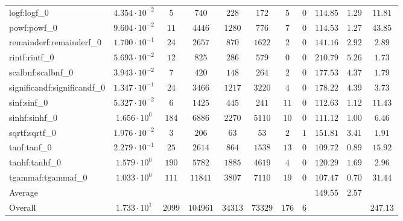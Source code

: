 \begin{tabular}{|l|c|c|c|c|c|c|c|c|c|c|}
logf:logf\_0                 & $ 4.354 \cdot 10^{-2} $ & $ 5      $ & $ 740    $ & $ 228   $ & $ 172   $ & $ 5   $ & $ 0 $ & $ 114.85      $ & $ 1.29    $ & $ 11.81   $ \\
powf:powf\_0                 & $ 9.604 \cdot 10^{-2} $ & $ 11     $ & $ 4446   $ & $ 1280  $ & $ 776   $ & $ 7   $ & $ 0 $ & $ 114.53      $ & $ 1.27    $ & $ 43.85   $ \\
remainderf:remainderf\_0     & $ 1.700 \cdot 10^{-1} $ & $ 24     $ & $ 2657   $ & $ 870   $ & $ 1622  $ & $ 2   $ & $ 0 $ & $ 141.16      $ & $ 2.92    $ & $ 2.89    $ \\
rintf:rintf\_0               & $ 5.693 \cdot 10^{-2} $ & $ 12     $ & $ 825    $ & $ 286   $ & $ 579   $ & $ 0   $ & $ 0 $ & $ 210.79      $ & $ 5.26    $ & $ 1.73    $ \\
scalbnf:scalbnf\_0           & $ 3.943 \cdot 10^{-2} $ & $ 7      $ & $ 420    $ & $ 148   $ & $ 264   $ & $ 2   $ & $ 0 $ & $ 177.53      $ & $ 4.37    $ & $ 1.79    $ \\
significandf:significandf\_0 & $ 1.347 \cdot 10^{-1} $ & $ 24     $ & $ 3466   $ & $ 1217  $ & $ 3220  $ & $ 4   $ & $ 0 $ & $ 178.22      $ & $ 4.39    $ & $ 3.73    $ \\
sinf:sinf\_0                 & $ 5.327 \cdot 10^{-2} $ & $ 6      $ & $ 1425   $ & $ 445   $ & $ 241   $ & $ 11  $ & $ 0 $ & $ 112.63      $ & $ 1.12    $ & $ 11.43   $ \\
sinhf:sinhf\_0               & $ 1.656 \cdot 10^{0}  $ & $ 184    $ & $ 6886   $ & $ 2270  $ & $ 5110  $ & $ 10  $ & $ 0 $ & $ 111.12      $ & $ 1.00    $ & $ 6.46    $ \\
sqrtf:sqrtf\_0               & $ 1.976 \cdot 10^{-2} $ & $ 3      $ & $ 206    $ & $ 63    $ & $ 53    $ & $ 2   $ & $ 1 $ & $ 151.81      $ & $ 3.41    $ & $ 1.91    $ \\
tanf:tanf\_0                 & $ 2.279 \cdot 10^{-1} $ & $ 25     $ & $ 2614   $ & $ 864   $ & $ 1538  $ & $ 13  $ & $ 0 $ & $ 109.72      $ & $ 0.89    $ & $ 15.92   $ \\
tanhf:tanhf\_0               & $ 1.579 \cdot 10^{0}  $ & $ 190    $ & $ 5782   $ & $ 1885  $ & $ 4619  $ & $ 4   $ & $ 0 $ & $ 120.29      $ & $ 1.69    $ & $ 2.96    $ \\
tgammaf:tgammaf\_0           & $ 1.033 \cdot 10^{0}  $ & $ 111    $ & $ 11841  $ & $ 3807  $ & $ 7110  $ & $ 19  $ & $ 0 $ & $ 107.47      $ & $ 0.70    $ & $ 31.44   $ \\
\hline
Average                      & $                     $ & $        $ & $        $ & $       $ & $       $ & $     $ & $   $ & $ 149.55      $ & $ 2.57    $ & $         $ \\
\hline
Overall                      & $ 1.733 \cdot 10^{1}  $ & $ 2099   $ & $ 104961 $ & $ 34313 $ & $ 73329 $ & $ 176 $ & $ 6 $ & $             $ & $         $ & $ 247.13  $ \\
\hline
\end{tabular}
